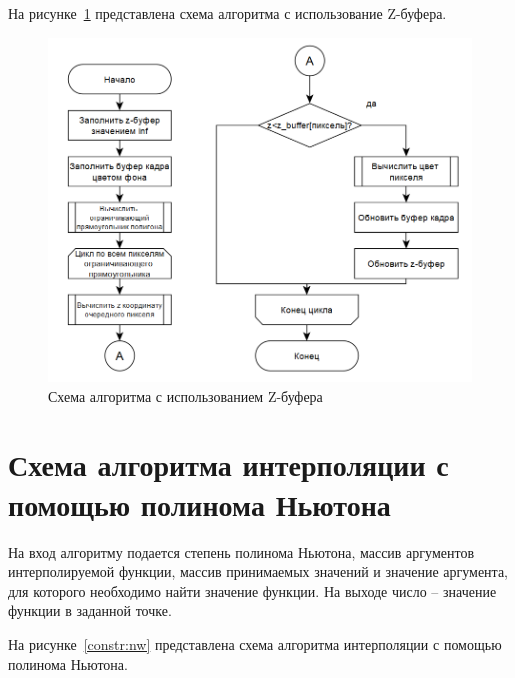 \documentclass[a4paper, 14pt]{extreport}
\begin{document}
На рисунке~\ref{constr:z} представлена схема алгоритма с использование Z-буфера.

\begin{figure}[h]
	\centering
	\includegraphics[scale=0.8]{tools/alg_z.png}
	\caption{Схема алгоритма с использованием Z-буфера}
	\label{constr:z}
\end{figure}

\section{Схема алгоритма интерполяции с помощью полинома Ньютона}

На вход алгоритму подается степень полинома Ньютона, массив аргументов интерполируемой функции, массив принимаемых 
значений и значение аргумента, для которого необходимо найти значение функции. На выходе число -- значение функции в 
заданной точке.

На рисунке~\ref{constr:nw} представлена схема алгоритма интерполяции с помощью полинома Ньютона.
\end{document}
